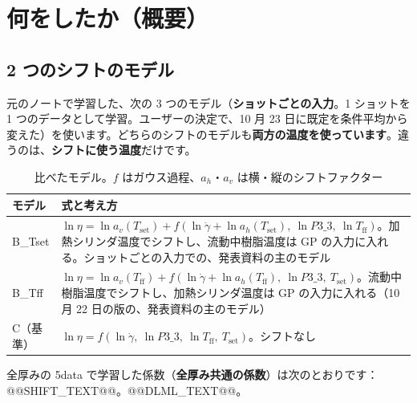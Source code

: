 \documentclass[paper=a4paper,fontsize=10.5pt,line_length=44zw,number_of_lines=38]{jlreq}
\newcommand{\gd}{\dot{\gamma}}
\newcommand{\Tff}{T_{\mathrm{ff}}}
\newcommand{\Tset}{T_{\mathrm{set}}}
\newcommand{\PIII}{P3\_3}
\begin{document}
\section{何をしたか（概要）}

\subsection{2 つのシフトのモデル}
元のノートで学習した、次の 3 つのモデル（\textbf{ショットごとの入力}。1 ショットを 1 つのデータとして学習。ユーザーの決定で、10 月 23 日に既定を条件平均から変えた）を使います。どちらのシフトのモデルも\textbf{両方の温度を使っています}。違うのは、\textbf{シフトに使う温度}だけです。
\begin{table}[H]
\caption{比べたモデル。$f$ はガウス過程、$a_h$・$a_v$ は横・縦のシフトファクター}\label{tab:model}
\small
\begin{tabularx}{\linewidth}{@{}l>{\raggedright\arraybackslash}X@{}}
\toprule
モデル & 式と考え方 \\
\midrule
B\_Tset & $\ln\eta=\ln a_v(\Tset)+f(\ln\gd+\ln a_h(\Tset),\ \ln\PIII,\ \ln\Tff)$。加熱シリンダ温度でシフトし、流動中樹脂温度は GP の入力に入れる。ショットごとの入力での、発表資料の主のモデル \\
B\_Tff & $\ln\eta=\ln a_v(\Tff)+f(\ln\gd+\ln a_h(\Tff),\ \ln\PIII,\ \Tset)$。流動中樹脂温度でシフトし、加熱シリンダ温度は GP の入力に入れる（10 月 22 日の版の、発表資料の主のモデル） \\
C（基準） & $\ln\eta=f(\ln\gd,\ \ln\PIII,\ \ln\Tff,\ \Tset)$。シフトなし \\
\bottomrule
\end{tabularx}
\end{table}
全厚みの 5data で学習した係数（\textbf{全厚み共通の係数}）は次のとおりです：@@SHIFT_TEXT@@。@@DLML_TEXT@@。
\end{document}
